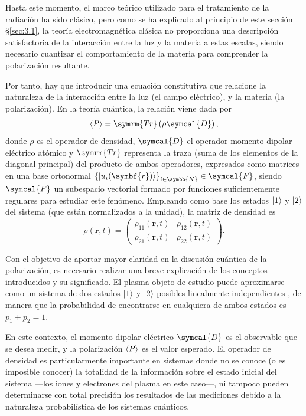 Hasta este momento, el marco teórico utilizado para el tratamiento de la radiación ha sido clásico, pero como se ha explicado al principio de este sección \S\ref{sec:3.1}, la teoría electromagnética clásica no proporciona una descripción satisfactoria \autocite{Griffiths2017} de la interacción entre la luz y la materia a estas escalas, siendo necesario cuantizar el comportamiento de la materia para comprender la polarización resultante.

Por tanto, hay que introducir una ecuación constitutiva que relacione la naturaleza de la interacción entre la luz (el campo eléctrico), y la materia (la polarización). En la teoría cuántica, la relación \autocite{Cohen-Tannoudji2019} viene dada por
\begin{equation}\label{eq:3.9}
  \xval{P} = \symrm{Tr} \left(\rho \symcal{D} \right),
\end{equation}
donde $\rho$ es el operador de densidad, $\symcal{D}$ el operador momento dipolar eléctrico atómico y $\symrm{Tr}$ representa la traza (suma de los elementos de la diagonal principal) del producto de ambos operadores, expresados como matrices en una base ortonormal $\left\{\ket{u_{i}(\symbf{r})}\right\}_{i \in \symbb{N}} \in \symcal{F}$, siendo $\symcal{F}$ un subespacio vectorial \autocite{Cohen-Tannoudji2019} formado por funciones suficientemente regulares para estudiar este fenómeno. Empleando como base los estados $\left|1\right\rangle$ y $\left|2\right\rangle$ del sistema (que están normalizados a la unidad), la matriz de densidad es
\begin{equation}\label{eq:3.10}
  \rho(\symbf{r},t) = 
  \begin{pmatrix}
    \rho_{11}(\symbf{r},t) & \rho_{12}(\symbf{r},t) \\
    \rho_{21}(\symbf{r},t) & \rho_{22}(\symbf{r},t)
  \end{pmatrix}.
\end{equation}

Con el objetivo de aportar mayor claridad en la discusión cuántica de la polarización, es necesario realizar una breve explicación de los conceptos introducidos y su significado. El plasma objeto de estudio puede aproximarse \autocite{Milonni1988} como un sistema de dos estados $\left|1\right\rangle$ y $\left|2\right\rangle$ posibles linealmente independientes \autocite{Cohen-Tannoudji2019}, de manera que la probabilidad de encontrarse en cualquiera de ambos estados es $p_{1} + p_{2} = 1$.

En este contexto, el momento dipolar eléctrico $\symcal{D}$ es el observable que se desea medir, y la polarización $\left\langle P\right\rangle$ es el valor esperado. El operador de densidad es particularmente importante en sistemas donde no se conoce (o es imposible conocer) la totalidad de la información sobre el estado inicial del sistema ---los iones y electrones del plasma en este caso---, ni tampoco pueden determinarse con total precisión los resultados de las mediciones debido a la naturaleza probabilística de los sistemas cuánticos. 

